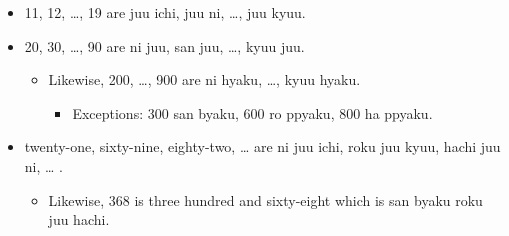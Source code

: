 \documentclass[11pt]{article}
\begin{document}
\begin{itemize}
\item 11, 12, …, 19  are juu ichi, juu ni, …, juu kyuu.
\item 20, 30, …, 90  are ni juu, san juu, …, kyuu juu.
\begin{itemize}
\item Likewise, 200, …, 900 are ni hyaku, …, kyuu hyaku.
\begin{itemize}
\item Exceptions: 300 san byaku, 600 ro ppyaku, 800 ha ppyaku.
\end{itemize}
\end{itemize}
\item twenty-one, sixty-nine, eighty-two, … are 
ni juu ichi, roku juu kyuu, hachi juu ni, … .
\begin{itemize}
\item Likewise, 368 is three hundred and sixty-eight which is san byaku roku juu hachi.
\end{itemize}
\end{itemize}
\end{document}
